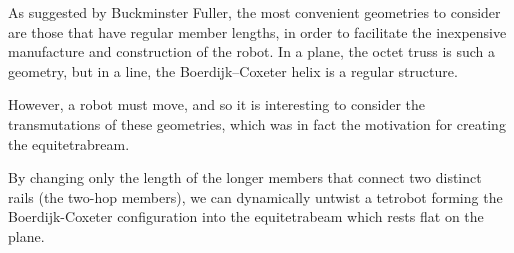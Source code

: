 \documentclass[review]{siamonline1116}
\begin{document}
As suggested by Buckminster Fuller, the most convenient geometries to
consider are those that have regular member lengths, in order to
facilitate the inexpensive manufacture and construction of the robot.
In a plane, the octet truss\cite{richard1961synergetic} is such a geometry, but in a line, the
Boerdijk--Coxeter helix is a regular structure.

However, a robot must move, and so it is interesting to consider the
transmutations of these geometries, which was in fact the motivation
for creating the equitetrabream.

\begin{theorem}
  By changing only the length of the longer members that connect two distinct rails (the two-hop members), we can dynamically untwist a tetrobot
  forming the Boerdijk-Coxeter configuration into the equitetrabeam which rests flat on the plane.
\end{theorem}
\end{document}
